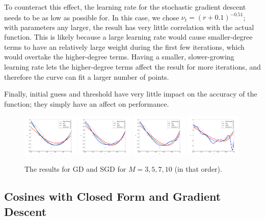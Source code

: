 \documentclass[10pt]{paper}
\begin{document}
To counteract this effect, the learning rate for the stochastic gradient descent needs to be as low as possible for. In this case, we chose $\nu_t = (r + 0.1)^{-0.51}$; with parameters any larger, the result has very little correlation with the actual function. This is likely because a large learning rate would cause smaller-degree terms to have an relatively large weight during the first few iterations, which would overtake the higher-degree terms. Having a smaller, slower-growing learning rate lets the higher-degree terms affect the result for more iterations, and therefore the curve can fit a larger number of points. 

Finally, initial guess and threshold have very little impact on the accuracy of the function; they simply have an affect on performance.

\begin{figure}[ht!]
  \centering
  \label{fig:gd_m}
  \includegraphics[width=0.24\textwidth]{../images/all_m_3}
  \includegraphics[width=0.24\textwidth]{../images/all_m_5}
  \includegraphics[width=0.24\textwidth]{../images/all_m_7}
  \includegraphics[width=0.24\textwidth]{../images/all_m_10}
  \caption{The results for GD and SGD for $M = 3, 5, 7, 10$ (in that order).}
\end{figure}

\subsection{Cosines with Closed Form and Gradient Descent}
\end{document}
